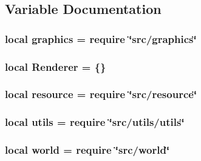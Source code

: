 \subsection{Variable Documentation}
\hypertarget{renderer_8lua_aae06ace8bee01f93d02dfaa4436de916}{
\subsubsection[{graphics}]{\setlength{\rightskip}{0pt plus 5cm}local graphics = require \char`\"{}src/graphics\char`\"{}}}\label{renderer_8lua_aae06ace8bee01f93d02dfaa4436de916}
\hypertarget{renderer_8lua_ae4ca4c644d523f931a9f0ac865e568a6}{
\subsubsection[{Renderer}]{\setlength{\rightskip}{0pt plus 5cm}local Renderer = \{\}}}\label{renderer_8lua_ae4ca4c644d523f931a9f0ac865e568a6}
\hypertarget{renderer_8lua_a24ad487107aaa56bef35825abbe9773d}{
\subsubsection[{resource}]{\setlength{\rightskip}{0pt plus 5cm}local resource = require \char`\"{}src/resource\char`\"{}}}\label{renderer_8lua_a24ad487107aaa56bef35825abbe9773d}
\hypertarget{renderer_8lua_a9b2ba82def3d3656dc370bac0a641700}{
\subsubsection[{utils}]{\setlength{\rightskip}{0pt plus 5cm}local utils = require \char`\"{}src/utils/utils\char`\"{}}}\label{renderer_8lua_a9b2ba82def3d3656dc370bac0a641700}
\hypertarget{renderer_8lua_a054520f514ab0d9a9b0fede5a23db9f7}{
\subsubsection[{world}]{\setlength{\rightskip}{0pt plus 5cm}local world = require \char`\"{}src/world\char`\"{}}}\label{renderer_8lua_a054520f514ab0d9a9b0fede5a23db9f7}
